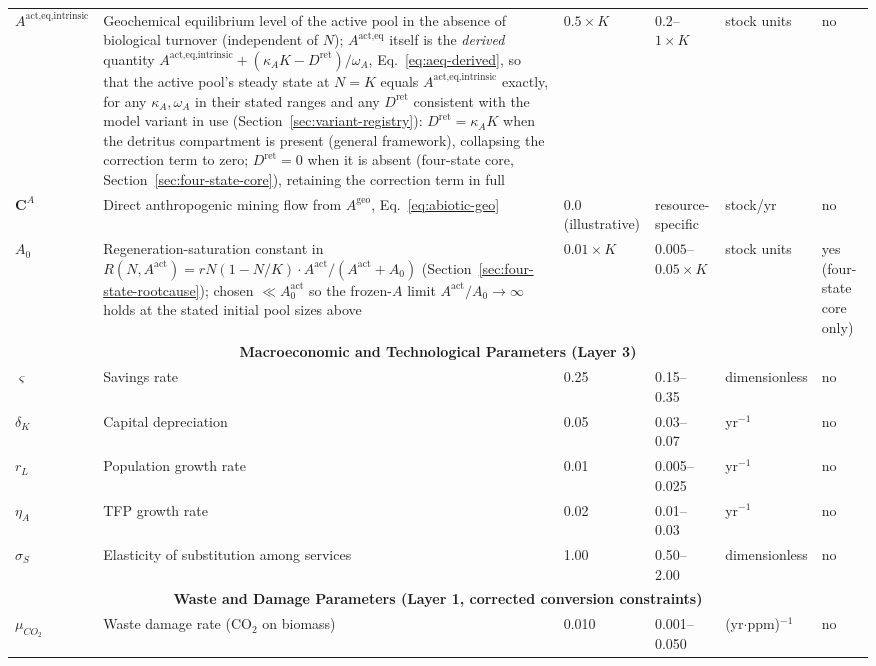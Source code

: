 \documentclass[twocolumn,10pt]{article}
\begin{document}
\begin{table}[t]
\begin{tabularx}{\textwidth}{l X l l l l}
\(A^{\text{act},\text{eq,intrinsic}}\) & Geochemical equilibrium level of the active pool in the absence of biological turnover (independent of $N$); $A^{\text{act},\text{eq}}$ itself is the \emph{derived} quantity $A^{\text{act},\text{eq,intrinsic}}+(\kappa_A K-D^{\text{ret}})/\omega_A$, Eq.~\eqref{eq:aeq-derived}, so that the active pool's steady state at $N=K$ equals $A^{\text{act},\text{eq,intrinsic}}$ exactly, for any $\kappa_A,\omega_A$ in their stated ranges and any $D^{\text{ret}}$ consistent with the model variant in use (Section~\ref{sec:variant-registry}): $D^{\text{ret}}=\kappa_A K$ when the detritus compartment is present (general framework), collapsing the correction term to zero; $D^{\text{ret}}=0$ when it is absent (four-state core, Section~\ref{sec:four-state-core}), retaining the correction term in full & \(0.5\times K\) & \(0.2\)--\(1\times K\) & stock units & no \\
\(\mathbf{C}^A\) & Direct anthropogenic mining flow from \(A^{\text{geo}}\), Eq.~\eqref{eq:abiotic-geo} & 0.0 (illustrative) & resource-specific & stock/yr & no \\
\(A_0\) & Regeneration-saturation constant in $R(N,A^{\text{act}})=rN(1-N/K)\cdot A^{\text{act}}/(A^{\text{act}}+A_0)$ (Section~\ref{sec:four-state-rootcause}); chosen $\ll A^{\text{act}}_0$ so the frozen-$A$ limit $A^{\text{act}}/A_0\to\infty$ holds at the stated initial pool sizes above & \(0.01\times K\) & \(0.005\)--\(0.05\times K\) & stock units & yes (four-state core only) \\
\midrule
\multicolumn{6}{c}{\textbf{Macroeconomic and Technological Parameters (Layer 3)}} \\
\(\varsigma\) & Savings rate & 0.25 & 0.15--0.35 & dimensionless & no \\
\(\delta_K\) & Capital depreciation & 0.05 & 0.03--0.07 & yr\(^{-1}\) & no \\
\(r_L\) & Population growth rate & 0.01 & 0.005--0.025 & yr\(^{-1}\) & no \\
\(\eta_A\) & TFP growth rate & 0.02 & 0.01--0.03 & yr\(^{-1}\) & no \\
\(\sigma_S\) & Elasticity of substitution among services & 1.00 & 0.50--2.00 & dimensionless & no \\
\midrule
\multicolumn{6}{c}{\textbf{Waste and Damage Parameters (Layer 1, corrected conversion constraints)}} \\
\(\mu_{CO_2}\) & Waste damage rate (CO\(_2\) on biomass) & 0.010 & 0.001--0.050 & (yr\(\cdot\)ppm)\(^{-1}\) & no \\

\end{tabularx}
\end{table}
\end{document}
